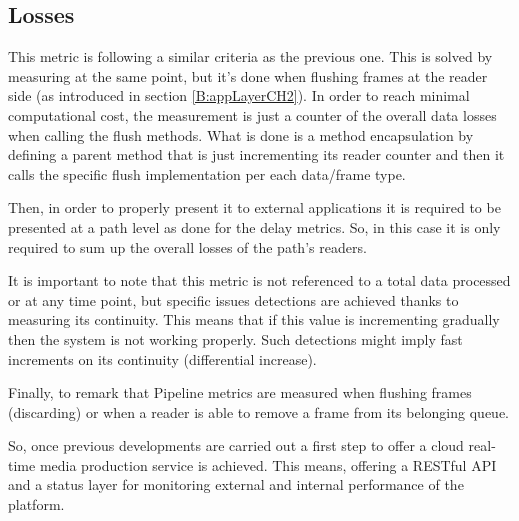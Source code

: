 \subsection{Losses}

This metric is following a similar criteria as the previous one. This is solved by measuring at the same point, but it's done when flushing frames at the reader side (as introduced in section \ref{B:appLayerCH2}). In order to reach minimal computational cost, the measurement is just a counter of the overall data losses when calling the flush methods. What is done is a method encapsulation by defining a parent method that is just incrementing its reader counter and then it calls the specific flush implementation per each data/frame type.

Then, in order to properly present it to external applications it is required to be presented at a path level as done for the delay metrics. So, in this case it is only required to sum up the overall losses of the path's readers.

It is important to note that this metric is not referenced to a total data processed or at any time point, but specific issues detections are achieved thanks to measuring its continuity. This means that if this value is incrementing gradually then the system is not working properly. Such detections might imply fast increments on its continuity (differential increase). 

Finally, to remark that Pipeline metrics are measured when flushing frames (discarding) or when a reader is able to remove a frame from its belonging queue. 

So, once previous developments are carried out a first step to offer a cloud real-time media production service is achieved. This means, offering a RESTful API and a status layer for monitoring external and internal performance of the platform.